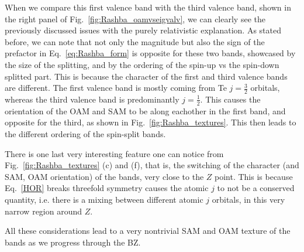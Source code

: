 When we compare this first valence band with the third valence band, shown in the right panel of Fig.~\ref{fig:Rashba_oamvseigvalv}, we can clearly see the previously discussed issues with the purely relativistic explanation. As stated before, we can note that not only the magnitude but also the sign of the prefactor in Eq.~\ref{eq:Rashba_form} is opposite for these two bands, showcased by the size of the splitting, and by the ordering of the spin-up vs the spin-down splitted part. This is because the character of the first and third valence bands are different. The first valence band is mostly coming from Te $j=\frac{3}{2}$ orbitals, whereas the third valence band is predominantly $j=\frac{1}{2}$. This causes the orientation of the OAM and SAM to be along eachother in the first band, and opposite for the third, as shown in Fig.~\ref{fig:Rashba_textures}. This then leads to the different ordering of the spin-split bands.

There is one last very interesting feature one can notice from Fig.~\ref{fig:Rashba_textures} (c) and (f), that is, the switching of the character (and SAM, OAM orientation) of the bands, very close to the $Z$ point. This is because Eq.~\ref{HOR} breaks threefold symmetry causes the atomic $j$ to not be a conserved quantity, i.e. there is a mixing between different atomic $j$ orbitals, in this very narrow region around $Z$.

All these considerations lead to a very nontrivial SAM and OAM texture of the bands as we progress through the BZ.

\begin{figure*}[h]
\centering
{}
\caption{\label{fig:Rashba_oamvseigvalv}Comparison between the real-space observables and energy dispersion in (a) the first and (b) third valence band. The values are plotted in function of the relative distance from the $Z$ point $\bm{k}_r = \bm{k} - \bm{k}_Z$, towards the A and U points. The green graphs denote the values before turning on atomic SOC, whereas the orange and blue graphs denote the two spin-split bands.}
\end{figure*}

